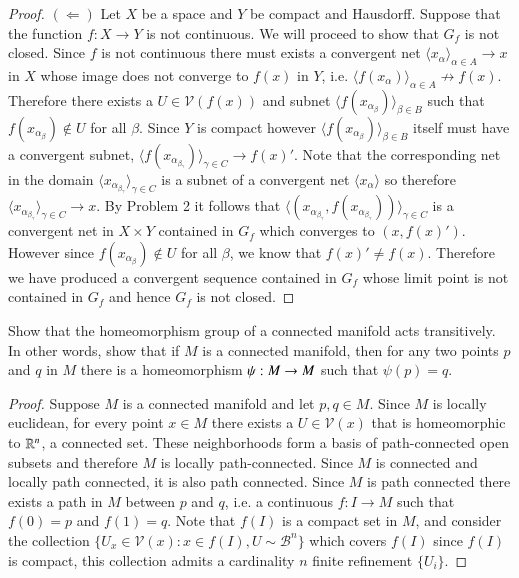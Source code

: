 \documentclass[minion]{homework651}
\begin{document}
\begin{problems}
\begin{proof}$(\Leftarrow)$  Let $X$ be a space and $Y$ be compact and Hausdorff. Suppose that the function $f:X \rightarrow Y$
    is not continuous. We will proceed to show that $G_f$ is not closed. Since $f$ is not continuous there must exists a convergent net $\langle x_\alpha\rangle_{\alpha \in A} \to x$
    in $X$ whose image does not converge to $f(x)$ in $Y$, i.e. $\langle f(x_\alpha)\rangle_{\alpha \in A}\not\to f(x)$. Therefore there exists a $U \in \mathcal{V}(f(x))$ and 
    subnet $\langle f(x_{\alpha_\beta})\rangle_{\beta \in B}$ such that $f(x_{\alpha_\beta}) \not\in U$ for all $\beta$. Since $Y$ is compact however 
    $\langle f(x_{\alpha_\beta})\rangle_{\beta \in B}$ itself must have a convergent subnet, $\langle f(x_{\alpha_{\beta_\gamma}})\rangle_{\gamma \in C} \to f(x)'$. Note that the 
    corresponding net in the domain $\langle x_{\alpha_{\beta_\gamma}} \rangle_{\gamma \in C}$ is a subnet of a convergent net $\langle x_\alpha \rangle$ so therefore $\langle x_{\alpha_{\beta_\gamma}} \rangle_{\gamma \in C} \to x$. 
    By Problem 2 it follows that $\langle ( x_{\alpha_{\beta_\gamma}},f(x_{\alpha_{\beta_\gamma}})) \rangle_{\gamma \in C}$ is a convergent net in $X \times Y$ contained in $G_f$ which converges to $(x, f(x)')$. However 
    since $f(x_{\alpha_\beta}) \not\in U$ for all $\beta$, we know that $f(x)' \neq f(x)$. Therefore we have produced a convergent sequence contained in $G_f$ whose limit point is not contained in $G_f$ and hence $G_f$ is not closed. 
\end{proof}




\problem Show that the homeomorphism group of a connected
manifold acts transitively.  In other words, show that if $M$ is a 
connected manifold, then for any two points $p$ and $q$ in $M$
there is a homeomorphism $\psi:M\rightarrow M$ such that $\psi(p)=q$.
\begin{proof} Suppose $M$ is a connected manifold and let $p, q \in M$. Since $M$ is locally euclidean, for every point $x \in M$
    there exists a $U \in \mathcal{V}(x)$ that is homeomorphic to $\mathbb R^n$, a connected set. These neighborhoods form a basis of path-connected open subsets 
    and therefore $M$ is locally path-connected. Since $M$ is connected and locally path connected, it is also path connected. Since $M$ is path connected 
    there exists a path in $M$ between $p$ and $q$, i.e. a continuous $f:I \to M$ such that $f(0) = p$ and $f(1) = q$. Note that $f(I)$ is a compact set in $M$, and consider 
    the collection $\{U_x \in \mathcal{V}(x): x \in f(I), U \sim \mathcal{B}^n\}$ which covers $f(I)$ since $f(I)$ is compact, this collection admits a cardinality $n$ finite refinement $\{U_i\}$.



\end{proof}
\end{problems}
\end{document}
